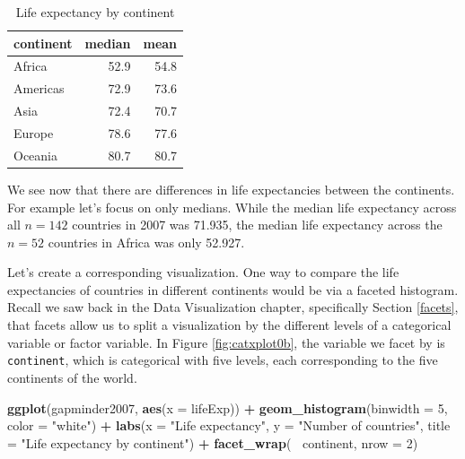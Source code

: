 \documentclass[12pt,]{krantz}
\makeatletter
\newenvironment{Shaded}{\begin{snugshade}}{\end{snugshade}}
\newcommand{\KeywordTok}[1]{\textcolor[rgb]{0.27,0.27,0.27}{\textbf{#1}}}
\newcommand{\DataTypeTok}[1]{\textcolor[rgb]{0.27,0.27,0.27}{#1}}
\newcommand{\DecValTok}[1]{\textcolor[rgb]{0.06,0.06,0.06}{#1}}
\newcommand{\StringTok}[1]{\textcolor[rgb]{0.5,0.5,0.5}{#1}}
\newcommand{\OperatorTok}[1]{\textcolor[rgb]{0.43,0.43,0.43}{\textbf{#1}}}
\newcommand{\NormalTok}[1]{#1}
\newenvironment{kframe}{%
\medskip{}
\setlength{\fboxsep}{.8em}
 \def\at@end@of@kframe{}%
 \ifinner\ifhmode%
  \def\at@end@of@kframe{\end{minipage}}%
  \begin{minipage}{\columnwidth}%
 \fi\fi%
 \def\FrameCommand##1{\hskip\@totalleftmargin \hskip-\fboxsep
 \colorbox{shadecolor}{##1}\hskip-\fboxsep
     \hskip-\linewidth \hskip-\@totalleftmargin \hskip\columnwidth}%
 \MakeFramed {\advance\hsize-\width
   \@totalleftmargin\z@ \linewidth\hsize
   \@setminipage}}%
 {\par\unskip\endMakeFramed%
 \at@end@of@kframe}
\renewenvironment{Shaded}{\begin{kframe}}{\end{kframe}}
\theoremstyle{definition}
\theoremstyle{definition}
\theoremstyle{definition}
\theoremstyle{remark}
\makeatother
\begin{document}
\begin{table}

\caption{\label{tab:catxplot0}Life expectancy by continent}
\centering
\begin{tabular}[t]{lrr}
\toprule
continent & median & mean\\
\midrule
Africa & 52.9 & 54.8\\
Americas & 72.9 & 73.6\\
Asia & 72.4 & 70.7\\
Europe & 78.6 & 77.6\\
Oceania & 80.7 & 80.7\\
\bottomrule
\end{tabular}
\end{table}

We see now that there are differences in life expectancies between the
continents. For example let's focus on only medians. While the median
life expectancy across all \(n = 142\) countries in 2007 was 71.935, the
median life expectancy across the \(n =52\) countries in Africa was only
52.927.

Let's create a corresponding visualization. One way to compare the life
expectancies of countries in different continents would be via a faceted
histogram. Recall we saw back in the Data Visualization chapter,
specifically Section \ref{facets}, that facets allow us to split a
visualization by the different levels of a categorical variable or
factor variable. In Figure \ref{fig:catxplot0b}, the variable we facet
by is \texttt{continent}, which is categorical with five levels, each
corresponding to the five continents of the world.

\begin{Shaded}
\begin{Highlighting}[]
\KeywordTok{ggplot}\NormalTok{(gapminder2007, }\KeywordTok{aes}\NormalTok{(}\DataTypeTok{x =}\NormalTok{ lifeExp)) }\OperatorTok{+}
\StringTok{  }\KeywordTok{geom_histogram}\NormalTok{(}\DataTypeTok{binwidth =} \DecValTok{5}\NormalTok{, }\DataTypeTok{color =} \StringTok{"white"}\NormalTok{) }\OperatorTok{+}
\StringTok{  }\KeywordTok{labs}\NormalTok{(}\DataTypeTok{x =} \StringTok{"Life expectancy"}\NormalTok{, }\DataTypeTok{y =} \StringTok{"Number of countries"}\NormalTok{, }
       \DataTypeTok{title =} \StringTok{"Life expectancy by continent"}\NormalTok{) }\OperatorTok{+}
\StringTok{  }\KeywordTok{facet_wrap}\NormalTok{(}\OperatorTok{~}\StringTok{ }\NormalTok{continent, }\DataTypeTok{nrow =} \DecValTok{2}\NormalTok{)}
\end{Highlighting}
\end{Shaded}
\end{document}
